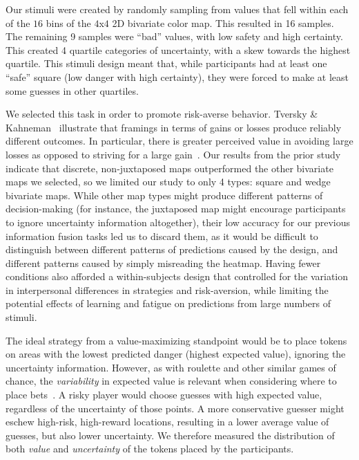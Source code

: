 Our stimuli were created by randomly sampling from values that fell within each of the $16$ bins of the $4$x$4$ 2D bivariate color map. This resulted in 16 samples. The remaining 9 samples were ``bad'' values, with low safety and high certainty. This created 4 quartile categories of uncertainty, with a skew towards the highest quartile. This stimuli design meant that, while participants had at least one ``safe'' square (low danger with high certainty), they were forced to make at least some guesses in other quartiles.

We selected this task in order to promote risk-averse behavior. Tversky \& Kahneman~\cite{tversky1985framing} illustrate that framings in terms of gains or losses produce reliably different outcomes. In particular, there is greater perceived value in avoiding large losses as opposed to striving for a large gain~\cite{kahneman1979prospect}. Our results from the prior study indicate that discrete, non-juxtaposed maps outperformed the other bivariate maps we selected, so we limited our study to only 4 types: square and wedge bivariate maps. While other map types might produce different patterns of decision-making (for instance, the juxtaposed map might encourage participants to ignore uncertainty information altogether), their low accuracy for our previous information fusion tasks led us to discard them, as it would be difficult to distinguish between different patterns of predictions caused by the design, and different patterns caused by simply misreading the heatmap. Having fewer conditions also afforded a within-subjects design that controlled for the variation in interpersonal differences in strategies and risk-aversion, while limiting the potential effects of learning and fatigue on predictions from large numbers of stimuli.

The ideal strategy from a value-maximizing standpoint would be to place tokens on areas with the lowest predicted danger (highest expected value), ignoring the uncertainty information. However, as with roulette and other similar games of chance, the \emph{variability} in expected value is relevant when considering where to place bets~\cite{mlodinow2009drunkard}. A risky player would choose guesses with high expected value, regardless of the uncertainty of those points. A more conservative guesser might eschew high-risk, high-reward locations, resulting in a lower average value of guesses, but also lower uncertainty. We therefore measured the distribution of both \emph{value} and \emph{uncertainty} of the tokens placed by the participants.

